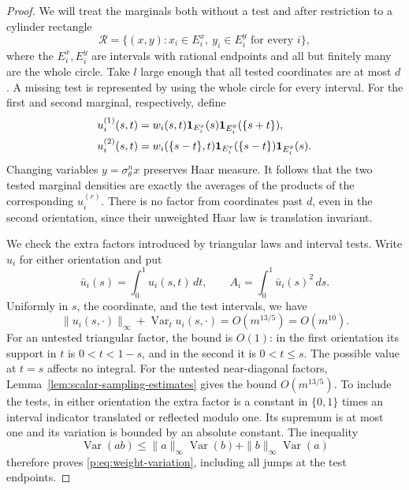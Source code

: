 \begin{proof}
We will treat the marginals both without a test and after restriction
to a cylinder rectangle
\[
 \mathcal R=\{(x,y):x_i\in E_i^x,\ y_i\in E_i^y
                         \text{ for every }i\},
\]
where the $E_i^x,E_i^y$ are intervals with rational endpoints and
all but finitely many are the whole circle.  Take $l$ large enough
that all tested coordinates are at most $d$.  A missing test is
represented by using the whole circle for every interval.  For the
first and second marginal, respectively, define
\begin{equation}\label{p:eq:oriented-weights}
 \begin{split}
 u_i^{(1)}(s,t)
 &=w_i(s,t)\mathbf 1_{E_i^x}(s)\mathbf 1_{E_i^y}(\{s+t\}),\\
 u_i^{(2)}(s,t)
 &=w_i(\{s-t\},t)\mathbf 1_{E_i^x}(\{s-t\})\mathbf 1_{E_i^y}(s).
 \end{split}
\end{equation}
Changing variables $y=\sigma_\theta^n x$ preserves Haar measure.
It follows that the two tested marginal densities are exactly the
averages of the products of the corresponding $u_i^{(r)}$.
There is no factor from coordinates past $d$, even in the second
orientation, since their unweighted Haar law is translation invariant.

We check the extra factors introduced by triangular laws and interval
tests.  Write $u_i$ for either orientation and put
\[
 \bar u_i(s)=\int_0^1u_i(s,t)\,dt,\qquad
 A_i=\int_0^1\bar u_i(s)^2\,ds.
\]
Uniformly in $s$, the coordinate, and the test intervals, we have
\begin{equation}\label{p:eq:weight-variation}
 \|u_i(s,\cdot)\|_\infty+
       \operatorname{Var}_t u_i(s,\cdot)
 =O(m^{13/5})=O(m^{10}).
\end{equation}
For an untested triangular factor, the bound is $O(1)$: in the first
orientation its support in $t$ is $0<t<1-s$, and in the second it is
$0<t\le s$.  The possible value at $t=s$ affects no integral.
For the untested near-diagonal factors,
Lemma~\ref{lem:scalar-sampling-estimates} gives the bound
$O(m^{13/5})$.  To include the tests, in either orientation the
extra factor is a constant in $\{0,1\}$ times an interval indicator
translated or reflected modulo one.  Its supremum is at most one
and its variation is bounded by an absolute constant.  The inequality
\[
 \operatorname{Var}(ab)\le
 \|a\|_\infty\operatorname{Var}(b)
 +\|b\|_\infty\operatorname{Var}(a)
\]
therefore proves \eqref{p:eq:weight-variation}, including all jumps at
the test endpoints.


\end{proof}
